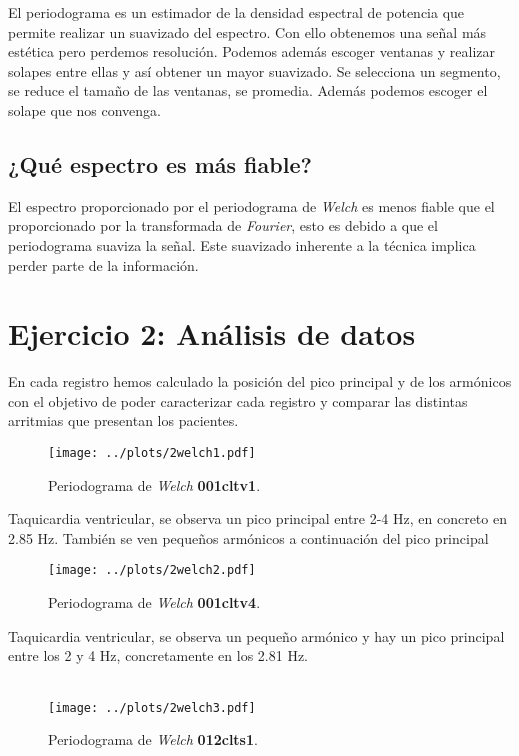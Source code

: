 \documentclass{article}
\begin{document}
El periodograma es un estimador de la densidad espectral de potencia
que permite realizar un suavizado del espectro. Con ello obtenemos una
señal más estética pero perdemos resolución. Podemos además escoger
ventanas y realizar solapes entre ellas y así obtener un mayor
suavizado. Se selecciona un segmento, se reduce el tamaño de las
ventanas, se promedia. Además podemos escoger el solape que nos
convenga.

\subsection{¿Qué espectro es más fiable?}

El espectro proporcionado por el periodograma de \textit{Welch} es
menos fiable que el proporcionado por la transformada de
\textit{Fourier}, esto es debido a que el periodograma suaviza la
señal. Este suavizado inherente a la técnica implica
perder parte de la información.

\newpage
\section{Ejercicio 2: Análisis de datos}

En cada registro hemos calculado la posición del pico principal y de
los armónicos con el objetivo de poder caracterizar cada registro y
comparar las distintas arritmias que presentan los pacientes.

\begin{figure}[h]
\centering
\texttt{[image: ../plots/2welch1.pdf]}
\vspace{-1.5cm}
\caption{Periodograma de \textit{Welch} \textbf{001cltv1}.}
\end{figure}

Taquicardia ventricular, se observa un pico principal entre 2-4 Hz, en
concreto en 2.85 Hz. También se ven pequeños armónicos a continuación
del pico principal

\begin{figure}[h]
\centering
\texttt{[image: ../plots/2welch2.pdf]}
\caption{Periodograma de \textit{Welch} \textbf{001cltv4}.}
\end{figure}

Taquicardia ventricular, se observa un pequeño armónico y hay un pico
principal entre los 2 y 4 Hz, concretamente en los 2.81 Hz.
\\\\
\begin{figure}[h]
\centering
\texttt{[image: ../plots/2welch3.pdf]}
\caption{Periodograma de \textit{Welch} \textbf{012clts1}.}
\end{figure}
\end{document}
